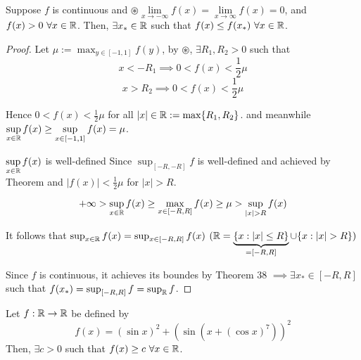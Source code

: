 \begin{example}
    Suppose $f$ is continuous and $\circledast \lim\limits_{x \to -\infty} f(x) = \lim\limits_{x \to \infty} f(x) = 0$, 
    and $f(x) > 0\ \forall x \in \mathbb R$. Then, $\exists x_* \in \mathbb R$ such that $f(x) \leq f(x_*)\ \forall x \in \mathbb R$.
\end{example}

\begin{proof}
    Let $\mu := \displaystyle\max_{y \in \left[-1, 1\right]} f(y)$, by $\circledast$, $\exists R_1, R_2 > 0$ such that
    $$x < -R_1 \implies 0 < f(x) < \frac{1}{2} \mu$$ 
    $$x > R_2 \implies 0 < f(x) < \frac{1}{2} \mu$$ 

    Hence $0 < f(x) < \frac{1}{2} \mu$ for all $|x| \in \mathbb R := \max\{R_1, R_2\}$.
    and meanwhile $\displaystyle\sup_{x \in \mathbb R} f(x) \geq \displaystyle\sup_{x \in \left[-1, 1\right]} f(x) = \mu$.

    $\displaystyle\sup_{x \in \mathbb R} f(x)$ is well-defined Since $\sup_{\left[-R, -R\right]} f $ is well-defined and achieved by Theorem and 
    $|f(x)| < \frac{1}{2}\mu$ for $|x| > R$.

    $$ + \infty > \sup_{x \in \mathbb R} f(x) \geq \max_{x \in \left[-R, R\right]} f(x) \geq \mu > \sup_{|x| > R} f(x)$$

    It follows that $\sup_{x\in\mathbb R} f(x) = \sup_{x \in \left[-R, R\right]} f(x)$
    $(\mathbb R = \underbrace{\{x : |x| \leq R\}}_{=\left[-R, R\right]} \cup \{x : |x| > R\})$

    Since $f$ is continuous, it achieves its boundes by Theorem 38
    $\implies \exists x_* \in \left[-R, R\right]$ such that $f(x_*) = \sup_{\left[-R, R\right]} f = \sup_{\mathbb R} f$.
\end{proof}

\begin{example}
    Let $f: \mathbb R \to \mathbb R$ be defined by 
    $$f(x) = (\sin x)^2 + (\sin (x + (\cos x)^7))^2$$
    Then, $\exists c > 0$ such that $f(x) \geq c\ \forall x \in \mathbb R$.
\end{example}

